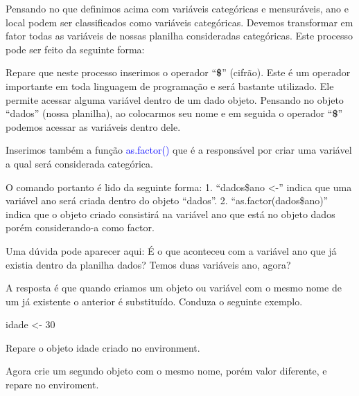 \documentclass[14pt,titlepage, oneside, openany, a4paper]{book}
\newenvironment{Shaded}{\begin{snugshade}}{\end{snugshade}}
\newcommand{\DecValTok}[1]{\textcolor[rgb]{0.00,0.00,0.81}{#1}}
\newcommand{\KeywordTok}[1]{\textcolor[rgb]{0.13,0.29,0.53}{\textbf{#1}}}
\newcommand{\NormalTok}[1]{#1}
\newcommand{\OperatorTok}[1]{\textcolor[rgb]{0.81,0.36,0.00}{\textbf{#1}}}
\newcommand{\StringTok}[1]{\textcolor[rgb]{0.31,0.60,0.02}{#1}}
\begin{document}
Pensando no que definimos acima com variáveis categóricas e mensuráveis, ano e local podem ser classificados como variáveis categóricas. Devemos transformar em fator todas as variáveis de nossas planilha consideradas categóricas. Este processo pode ser feito da seguinte forma:

\begin{Shaded}
\end{Shaded}

Repare que neste processo inserimos o operador ``\textbf{\$}'' (cifrão). Este é um operador importante em toda linguagem de programação e será bastante utilizado. Ele permite acessar alguma variável dentro de um dado objeto. Pensando no objeto ``dados'' (nossa planilha), ao colocarmos seu nome e em seguida o operador ``\textbf{\$}'' podemos acessar as variáveis dentro dele.

Inserimos também a função \textcolor{blue}{as.factor()} que é a responsável por criar uma variável a qual será considerada categórica.

O comando portanto é lido da seguinte forma:
1. ``dados\$ano \textless{}-'' indica que uma variável ano será criada dentro do objeto ``dados''.
2. ``as.factor(dados\$ano)'' indica que o objeto criado consistirá na variável ano que está no objeto dados porém considerando-a como factor.

Uma dúvida pode aparecer aqui: É o que aconteceu com a variável ano que já existia dentro da planilha dados? Temos duas variáveis ano, agora?

A resposta é que quando criamos um objeto ou variável com o mesmo nome de um já existente o anterior é substituído. Conduza o seguinte exemplo.

\begin{Shaded}
\begin{Highlighting}[]
\NormalTok{idade <-}\StringTok{ }\DecValTok{30}
\end{Highlighting}
\end{Shaded}

Repare o objeto idade criado no environment.

Agora crie um segundo objeto com o mesmo nome, porém valor diferente, e repare no enviroment.
\end{document}
